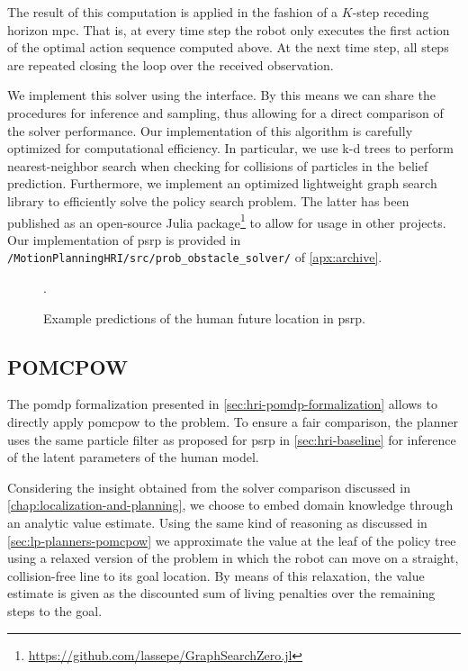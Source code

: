 The result of this computation is applied in the fashion of a $K$-step receding
horizon \ac{mpc}. That is, at every time step the robot only executes the first
action of the optimal action sequence computed above. At the next time step,
all steps are repeated closing the loop over the received observation.

We implement this solver using the \pomdpsjl interface. By this means we can
share the procedures for inference and sampling, thus allowing for a direct
comparison of the solver performance. Our implementation of this algorithm is
carefully optimized for computational efficiency. In particular, we use k-d
trees to perform nearest-neighbor search when checking for collisions of
particles in the belief prediction. Furthermore, we implement an optimized
lightweight graph search library to efficiently solve the policy search
problem. The latter has been published as an open-source Julia
package\footnote{\url{https://github.com/lassepe/GraphSearchZero.jl}} to allow
for usage in other projects. Our implementation of \ac{psrp} is provided in
\texttt{\appdata/MotionPlanningHRI/src/prob\_obstacle\_solver/} of \cref{apx:archive}.

\begin{figure}[htpb]
  \centering
  .
  \caption{Example predictions of the human future location in \acf{psrp}.}
  \label{fig:psrp-prediction-example}
\end{figure}

\subsection{POMCPOW}\label{sec:hri-planners}

The \ac{pomdp} formalization presented in \cref{sec:hri-pomdp-formalization}
allows to directly apply \ac{pomcpow} to the problem. To ensure a fair
comparison, the planner uses the same particle filter as proposed for \ac{psrp}
in \cref{sec:hri-baseline} for inference of the latent parameters of the human model.

Considering the insight obtained from the solver comparison discussed in
\cref{chap:localization-and-planning}, we choose to embed domain knowledge
through an analytic value estimate. Using the same kind of reasoning as
discussed in \cref{sec:lp-planners-pomcpow} we approximate the value at the
leaf of the policy tree using a relaxed version of the problem in which the
robot can move on a straight, collision-free line to its goal location. By
means of this relaxation, the value estimate is given as the discounted sum of
living penalties over the remaining steps to the goal.

